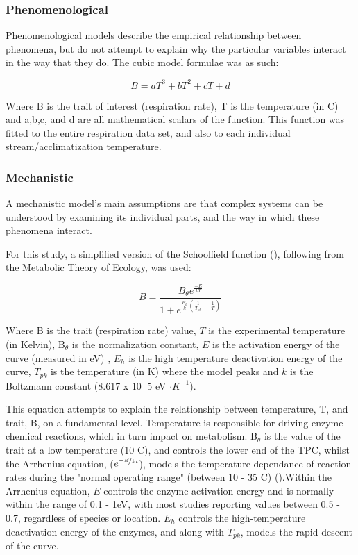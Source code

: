 \documentclass[../../Paper.tex]{subfiles}
\begin{document}
\subsubsection*{Phenomenological}

Phenomenological models describe the empirical relationship between phenomena,
but do not attempt to explain why the particular variables interact in the way
that they do. The cubic model formulae was as such:

\begin{equation}
B = aT^3 + bT^2 + cT + d
\end{equation}

Where B is the trait of interest (respiration rate), T is the temperature (in 
\degree C) and a,b,c, and d are all mathematical scalars of the function. This 
function was fitted to the entire respiration data set, and also to each individual
stream/acclimatization temperature.

\subsubsection*{Mechanistic}

A mechanistic model's main assumptions are that complex systems can be understood 
by examining its individual parts, and the way in which these phenomena 
interact. 

For this study, a simplified version of the Schoolfield function (\cite{schoolfield_non-linear_1981}), following from the Metabolic 
Theory of Ecology, was used:

\begin{equation}
B = \frac{B_{\theta} e^{\frac{-E}{kT}}}{1 + e^{\frac{E_h}{k} (\frac{1}{T_{pk}} - \frac{1}{T})}}
\end{equation}

Where B is the trait (respiration rate) value, $T$ is the experimental temperature (in Kelvin),
B$_\theta$ is the normalization constant, $E$ is the activation energy of the curve (measured in eV)
, $E_h$ is the high temperature deactivation energy of the curve, $T_{pk}$ is the temperature (in K) 
where the model peaks and $k$ is the Boltzmann constant (8.617 x $10^-5$ eV $ \cdot  K^{-1}$).


This equation attempts to explain the relationship between temperature, T, and trait, B, on a fundamental level. 
Temperature is responsible for driving enzyme chemical reactions, which in turn impact on 
metabolism. B$_\theta$ is the value of the trait at a low temperature 
(10 \degree C), and controls the lower end of the TPC, whilst the Arrhenius equation, ($e^{\nicefrac{-E}{kt}}$),
models the temperature dependance of reaction rates during the "normal operating range"
(between 10 - 35 \degree C) (\cite{brown_toward_2004}).Within the Arrhenius equation,  $E$ controls the enzyme activation energy and 
is normally within the range of 0.1 - 1eV, with most studies reporting values between 0.5 - 
0.7, regardless of species or location. $E_h$ controls the high-temperature deactivation energy
of the enzymes, and along with $T_{pk}$, models the rapid descent of the curve. 
\end{document}
